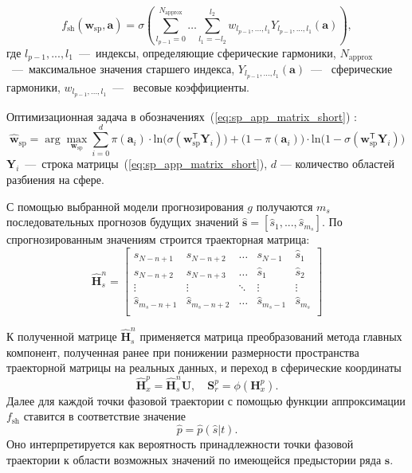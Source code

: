 \documentclass[article,14pt,subf,href,colorlinks=true
]{disser}
\begin{document}
\[
	f_{\text{sh}}(\mathbf{w}_{\text{sp}},\mathbf{a}) = \sigma\left(
	\sum_{l_{p-1} = 0}^{N_{\text{approx}}}
	\dots
	\sum_{l_1 = -l_2}^{l_2}
	w_{l_{p-1},...,l_1} Y_{l_{p-1},...,l_1}(\mathbf{a})\right),
\]
где $l_{p-1},...,l_1$~---~индексы, определяющие сферические гармоники, $N_{\text{approx}}$~---~максимальное значения старшего индекса, $Y_{l_{p-1},...,l_1}(\mathbf{a})$~---~ сферические гармоники, $w_{l_{p-1},...,l_1}$~---~ весовые коэффициенты.

Оптимизационная задача в обозначениях~(\ref{eq:sp_app_matrix_short}) :
\begin{equation}
    \mathbf{\hat{w}}_{\text{sp}} = \arg \max_{\mathbf{w}_{\text{sp}}}
    \sum_{i = 0}^{d}
    \pi(\mathbf{a}_i)\cdot\text{ln}\big(\sigma(\mathbf{w}_{\text{sp}}^{\mathsf{T}}\mathbf{{Y}}_i)\big) +
    \big(1 - \pi(\mathbf{a}_i)\big)\cdot\text{ln}\big(1 - \sigma(\mathbf{w}_{\text{sp}}^{\mathsf{T}}\mathbf{{Y}}_i)\big)
\label{eq:arg_logreg}
\end{equation}
 $\mathbf{{Y}}_i$~---~строка матрицы~(\ref{eq:sp_app_matrix_short}), $d$ --- количество областей разбиения на сфере.

С помощью выбранной модели прогнозирования $g$ получаются $m_s$ последовательных прогнозов будущих значений $\mathbf{\hat{s}} = [\hat{s}_1,...,\hat{s}_{m_s}]$.
По спрогнозированным значениям строится траекторная матрица:
\begin{equation*}
    \mathbf{\hat{H}}_{s}^{n} = 
    \begin{bmatrix} 
    	s_{N-n+1} & s_{N-n+2} &\ldots&s_{N-1} &\hat{s}_{1}\\
    	s_{N-n+2} & s_{N-n+3} &\ldots&\hat{s}_{1} &\hat{s}_{2}\\
    	\vdots& \vdots & \ddots & \vdots & \vdots\\
    	\hat{s}_{m_s-n+1} & \hat{s}_{m_s-n+2} &\ldots&\hat{s}_{m_s-1} &\hat{s}_{m_s}\\
    \end{bmatrix}
\end{equation*}

К полученной матрице $\mathbf{\hat{H}}_{s}^{n}$ применяется матрица преобразований метода главных компонент, полученная ранее при понижении размерности пространства траекторной матрицы на реальных данных, и переход в сферические координаты
\[
\mathbf{\hat{H}}_{x}^{p} = \mathbf{\hat{H}}_{s}^{n} \mathbf{U},\quad \mathbf{S}_{r}^{p} = \phi(\mathbf{H}_{x}^{p}).
\]
Далее для каждой точки фазовой траектории с помощью функции аппроксимации $f_{\text{sh}}$ ставится в соответствие значение
\[
\hat{p} = \hat{p}(\hat{s}|t).
\]
Оно интерпретируется как вероятность принадлежности точки фазовой траектории к области возможных значений по имеющейся предыстории ряда $\mathbf{{s}}$.
\end{document}
